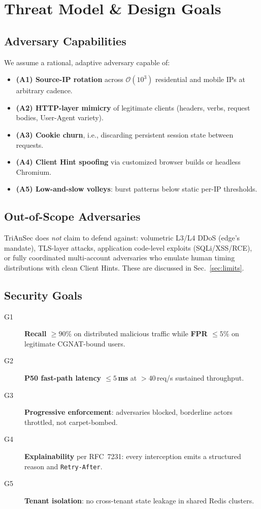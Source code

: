 \documentclass[journal,10pt]{IEEEtran}
\begin{document}
\section{Threat Model \& Design Goals}
\label{sec:threat}

\subsection{Adversary Capabilities}
We assume a rational, adaptive adversary capable of:
\begin{itemize}
    \item \textbf{(A1) Source-IP rotation} across $\mathcal{O}(10^3)$ residential and mobile IPs at arbitrary cadence.
    \item \textbf{(A2) HTTP-layer mimicry} of legitimate clients (headers, verbs, request bodies, User-Agent variety).
    \item \textbf{(A3) Cookie churn}, i.e., discarding persistent session state between requests.
    \item \textbf{(A4) Client Hint spoofing} via customized browser builds or headless Chromium.
    \item \textbf{(A5) Low-and-slow volleys}: burst patterns below static per-IP thresholds.
\end{itemize}

\subsection{Out-of-Scope Adversaries}
TriAnSec does \emph{not} claim to defend against: volumetric L3/L4 DDoS (edge's mandate), TLS-layer attacks, application code-level exploits (SQLi/XSS/RCE), or fully coordinated multi-account adversaries who emulate human timing distributions with clean Client Hints. These are discussed in Sec.~\ref{sec:limits}.

\subsection{Security Goals}
\begin{description}
    \item[G1] \textbf{Recall $\ge 90\%$} on distributed malicious traffic while \textbf{FPR $\le 5\%$} on legitimate CGNAT-bound users.
    \item[G2] \textbf{P50 fast-path latency $\le 5$\,ms} at ${>}40$\,req/s sustained throughput.
    \item[G3] \textbf{Progressive enforcement}: adversaries blocked, borderline actors throttled, not carpet-bombed.
    \item[G4] \textbf{Explainability} per RFC~7231: every interception emits a structured reason and \texttt{Retry-After}.
    \item[G5] \textbf{Tenant isolation}: no cross-tenant state leakage in shared Redis clusters.
\end{description}
\end{document}
